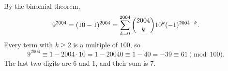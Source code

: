 By the binomial theorem,
\[
9^{2004}=(10-1)^{2004}=\sum_{k=0}^{2004}\dbinom{2004}{k}10^k(-1)^{2004-k}.
\]
Every term with $k\ge2$ is a multiple of $100$, so
\[
9^{2004}\equiv1-2004\cdot10=1-20040\equiv1-40=-39\equiv61\pmod{100}.
\]
The last two digits are $6$ and $1$, and their sum is $\boxed{7}$.

